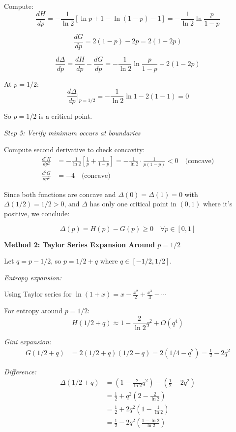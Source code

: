\documentclass[12pt]{article}
\begin{document}
\begin{solution}
Compute:
\[
\frac{dH}{dp} = -\frac{1}{\ln 2}[\ln p + 1 - \ln(1-p) - 1] = -\frac{1}{\ln 2}\ln\frac{p}{1-p}
\]

\[
\frac{dG}{dp} = 2(1-p) - 2p = 2(1-2p)
\]

\[
\frac{d\Delta}{dp} = \frac{dH}{dp} - \frac{dG}{dp} = -\frac{1}{\ln 2}\ln\frac{p}{1-p} - 2(1-2p)
\]

At $p = 1/2$:
\[
\frac{d\Delta}{dp}\bigg|_{p=1/2} = -\frac{1}{\ln 2}\ln 1 - 2(1-1) = 0
\]

So $p = 1/2$ is a critical point.

\textit{Step 5: Verify minimum occurs at boundaries}

Compute second derivative to check concavity:
\begin{align*}
\frac{d^2H}{dp^2} &= -\frac{1}{\ln 2}\left[\frac{1}{p} + \frac{1}{1-p}\right] = -\frac{1}{\ln 2} \cdot \frac{1}{p(1-p)} < 0 \quad \text{(concave)} \\
\frac{d^2G}{dp^2} &= -4 \quad \text{(concave)}
\end{align*}

Since both functions are concave and $\Delta(0) = \Delta(1) = 0$ with $\Delta(1/2) = 1/2 > 0$, and $\Delta$ has only one critical point in $(0,1)$ where it's positive, we conclude:

\[
\boxed{\Delta(p) = H(p) - G(p) \geq 0 \quad \forall p \in [0,1]}
\]

\textbf{Method 2: Taylor Series Expansion Around $p = 1/2$}

Let $q = p - 1/2$, so $p = 1/2 + q$ where $q \in [-1/2, 1/2]$.

\textit{Entropy expansion:}

Using Taylor series for $\ln(1+x) = x - \frac{x^2}{2} + \frac{x^3}{3} - \cdots$

For entropy around $p = 1/2$:
\[
H(1/2 + q) \approx 1 - \frac{2}{\ln 2}q^2 + O(q^4)
\]

\textit{Gini expansion:}
\begin{align*}
G(1/2 + q) &= 2(1/2 + q)(1/2 - q) = 2(1/4 - q^2) = \frac{1}{2} - 2q^2
\end{align*}

\textit{Difference:}
\begin{align*}
\Delta(1/2 + q) &= \left(1 - \frac{2}{\ln 2}q^2\right) - \left(\frac{1}{2} - 2q^2\right) \\
&= \frac{1}{2} + q^2\left(2 - \frac{2}{\ln 2}\right) \\
&= \frac{1}{2} + 2q^2\left(1 - \frac{1}{\ln 2}\right) \\
&= \frac{1}{2} - 2q^2\left(\frac{1-\ln 2}{\ln 2}\right)
\end{align*}


\end{solution}
\end{document}
